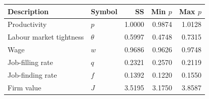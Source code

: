 \begin{tabular}{llrrr}
\toprule
\textbf{Description} & \textbf{Symbol} & \textbf{SS} & \textbf{Min $p$} & \textbf{Max $p$} \\
\midrule
Productivity          & $p$       &   1.0000 &   0.9874 &   1.0128 \\
Labour market tightness & $\theta$ &   0.5997 &   0.4748 &   0.7315 \\
Wage                    & $w$       &   0.9686 &   0.9626 &   0.9748 \\
Job-filling rate        & $q$       &   0.2321 &   0.2570 &   0.2119 \\
Job-finding rate        & $f$       &   0.1392 &   0.1220 &   0.1550 \\
Firm value              & $J$       &   3.5195 &   3.1750 &   3.8587 \\
\bottomrule
\end{tabular}
